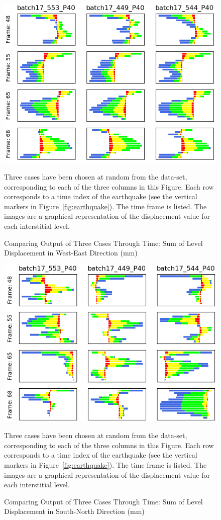 \begin{figure}[p]
	\centering
	\includegraphics[scale=0.6]{Figures/level_results1.png}
	\caption{Comparing Output of Three Cases Through Time: Sum of Level Displacement in West-East Direction (mm) } {Three cases have been chosen at random from the data-set, corresponding to each of the three columns in this Figure. Each row corresponds to a time index of the earthquake (see the vertical markers in Figure~\ref{fig:earthquake}). The time frame is listed. The images are a graphical representation of the displacement value for each interstitial level.}
	\label{fig:levels1}
\end{figure}

\begin{figure}[p]
	\centering
	\includegraphics[scale=0.6]{Figures/level_results2.png}
	\caption{Comparing Output of Three Cases Through Time: Sum of Level Displacement in South-North Direction (mm) } { Three cases have been chosen at random from the data-set, corresponding to each of the three columns in this Figure. Each row corresponds to a time index of the earthquake (see the vertical markers in Figure~\ref{fig:earthquake}). The time frame is listed. The images are a graphical representation of the displacement value for each interstitial level.}
	\label{fig:levels2}
\end{figure}


